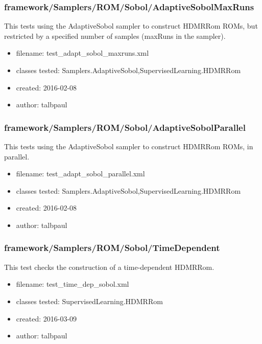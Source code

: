     \subsubsection{framework/Samplers/ROM/Sobol/AdaptiveSobolMaxRuns}
      
      This tests using the AdaptiveSobol sampler to construct HDMRRom ROMs, but restricted by
      a specified number of samples (maxRuns in the sampler).
    
      \begin{itemize}
          \item filename: test\_adapt\_sobol\_maxruns.xml
          \item classes tested: Samplers.AdaptiveSobol,SupervisedLearning.HDMRRom
          \item created: 2016-02-08
          \item author: talbpaul
      \end{itemize}
    \subsubsection{framework/Samplers/ROM/Sobol/AdaptiveSobolParallel}
      
      This tests using the AdaptiveSobol sampler to construct HDMRRom ROMs, in parallel.
    
      \begin{itemize}
          \item filename: test\_adapt\_sobol\_parallel.xml
          \item classes tested: Samplers.AdaptiveSobol,SupervisedLearning.HDMRRom
          \item created: 2016-02-08
          \item author: talbpaul
      \end{itemize}
    \subsubsection{framework/Samplers/ROM/Sobol/TimeDependent}
      
      This test checks the construction of a time-dependent HDMRRom.
    
      \begin{itemize}
          \item filename: test\_time\_dep\_sobol.xml
          \item classes tested: SupervisedLearning.HDMRRom
          \item created: 2016-03-09
          \item author: talbpaul
      \end{itemize}

